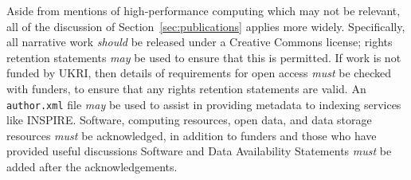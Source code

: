 \documentclass{article}
\newcommand\rfcword[1]{\emph{#1}\xspace}
\newcommand\must{\rfcword{must}}
\newcommand\should{\rfcword{should}}
\newcommand\may{\rfcword{may}}
\newcommand\filename[1]{\texttt{#1}\xspace}
\newcommand\authorxml{\filename{author.xml}}
\begin{document}
Aside from mentions of high-performance computing which may not be relevant,
all of the discussion of Section~\ref{sec:publications} applies more widely.
Specifically,
all narrative work \should be released under a Creative Commons license;
rights retention statements \may be used to ensure that this is permitted.
If work is not funded by UKRI,
then details of requirements for open access \must be checked with funders,
to ensure that any rights retention statements are valid.
An \authorxml file \may be used
to assist in providing metadata to indexing services like INSPIRE\@.
Software,
computing resources,
open data,
and data storage resources \must be acknowledged,
in addition to funders and those who have provided useful discussions
Software and Data Availability Statements \must be added after the acknowledgements.
\end{document}
